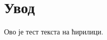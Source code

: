 \documentclass[12pt, a4paper]{article}
\begin{document}

\renewcommand{\contentsname}{Садржај}
\tableofcontents
\pagebreak

\section{Увод}

Ово је тест текста на ћирилици.
\end{document}
